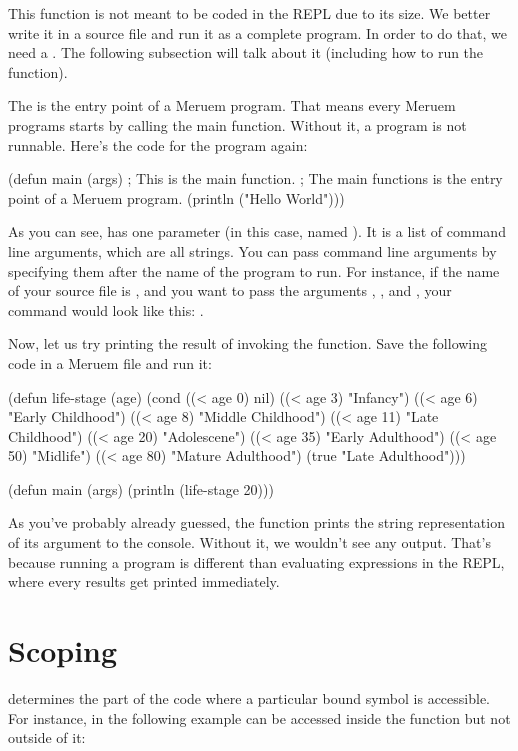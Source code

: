 This function is not meant to be coded in the REPL due to its size. We better write it in a source file and run it as a complete program. In order to do that, we need a . The following subsection will talk about it (including how to run the  function).

The  is the entry point of a Meruem program. That means every Meruem programs starts by calling the main function. Without it, a program is not runnable. Here's the code for the  program again:

\begin{REPL}
(defun main (args)    ; This is the main function.
  ; The main functions is the entry point of a Meruem program.
  (println ("Hello World")))
\end{REPL}

As you can see,  has one parameter (in this case, named ). It is a list of command line arguments, which are all strings. You can pass command line arguments by specifying them after the name of the program to run. For instance, if the name of your source file is , and you want to pass the arguments , , and , your command would look like this: .

Now, let us try printing the result of invoking the  function. Save the following code in a Meruem file and run it:

\begin{Meruem}
(defun life-stage (age)
   (cond 
     ((< age 0) nil)
     ((< age 3) "Infancy")
     ((< age 6) "Early Childhood")
     ((< age 8) "Middle Childhood")
     ((< age 11) "Late Childhood")
     ((< age 20) "Adolescene")
     ((< age 35) "Early Adulthood")
     ((< age 50) "Midlife")
     ((< age 80) "Mature Adulthood")
     (true "Late Adulthood")))

(defun main (args)
  (println (life-stage 20)))
\end{Meruem}

As you've probably already guessed, the  function prints the string representation of its argument to the console. Without it, we wouldn't see any output. That's because running a program is different than evaluating expressions in the REPL, where every results get printed immediately.

\section{Scoping}
 determines the part of the code where a particular bound symbol is accessible. For instance,  in the following example can be accessed inside the function  but not outside of it:

